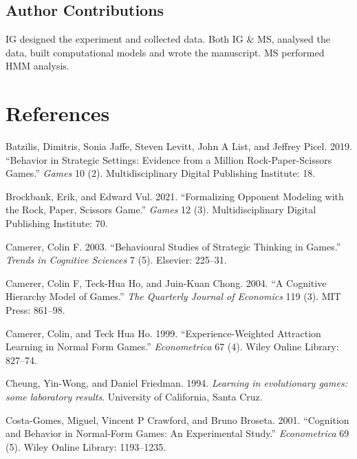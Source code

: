 \documentclass[smallextended]{svjour3}       %
\begin{document}
\hypertarget{author-contributions}{%
\subsection{Author Contributions}\label{author-contributions}}

IG designed the experiment and collected data. Both IG \& MS, analysed
the data, built computational models and wrote the manuscript. MS
performed HMM analysis.

\hypertarget{references}{%
\section*{References}\label{references}}

\hypertarget{refs}{}
\leavevmode\hypertarget{ref-batzilis2019behavior}{}%
Batzilis, Dimitris, Sonia Jaffe, Steven Levitt, John A List, and Jeffrey
Picel. 2019. ``Behavior in Strategic Settings: Evidence from a Million
Rock-Paper-Scissors Games.'' \emph{Games} 10 (2). Multidisciplinary
Digital Publishing Institute: 18.

\leavevmode\hypertarget{ref-brockbank2021formalizing}{}%
Brockbank, Erik, and Edward Vul. 2021. ``Formalizing Opponent Modeling
with the Rock, Paper, Scissors Game.'' \emph{Games} 12 (3).
Multidisciplinary Digital Publishing Institute: 70.

\leavevmode\hypertarget{ref-camerer2003behavioural}{}%
Camerer, Colin F. 2003. ``Behavioural Studies of Strategic Thinking in
Games.'' \emph{Trends in Cognitive Sciences} 7 (5). Elsevier: 225--31.

\leavevmode\hypertarget{ref-camerer2004cognitive}{}%
Camerer, Colin F, Teck-Hua Ho, and Juin-Kuan Chong. 2004. ``A Cognitive
Hierarchy Model of Games.'' \emph{The Quarterly Journal of Economics}
119 (3). MIT Press: 861--98.

\leavevmode\hypertarget{ref-camerer1999experience}{}%
Camerer, Colin, and Teck Hua Ho. 1999. ``Experience-Weighted Attraction
Learning in Normal Form Games.'' \emph{Econometrica} 67 (4). Wiley
Online Library: 827--74.

\leavevmode\hypertarget{ref-cheung1994learning}{}%
Cheung, Yin-Wong, and Daniel Friedman. 1994. \emph{Learning in
evolutionary games: some laboratory results}. University of California,
Santa Cruz.

\leavevmode\hypertarget{ref-costa2001cognition}{}%
Costa-Gomes, Miguel, Vincent P Crawford, and Bruno Broseta. 2001.
``Cognition and Behavior in Normal-Form Games: An Experimental Study.''
\emph{Econometrica} 69 (5). Wiley Online Library: 1193--1235.
\end{document}
